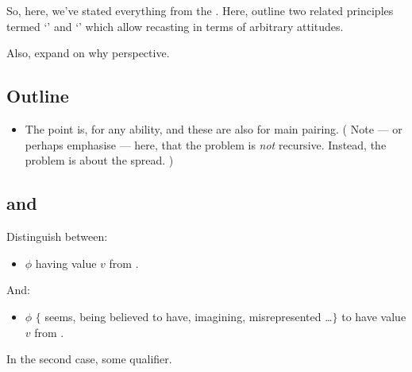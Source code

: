 \chapter{}
\label{cha:zSpA}

\nocite{Scriven:1962vq}
\nocite{Woodward:2021ue}
\nocite{Perry:1979vc}
\nocite{Perry:1986aa}

\begin{note}
  So, here, we've stated everything from the \agpe{}.
  Here, outline two related principles termed `\ptivity{}' and `\ptivityQ{}' which allow recasting in terms of arbitrary attitudes.

  Also, expand on why perspective.
\end{note}

\section{Outline}
\label{cha:zSpA:sec:outline}

\begin{note}
  \begin{itemize}
  \item
    The point is,  for any \abgen{} ability, and these are also  for main pairing.
    (%
    Note --- or perhaps emphasise --- here, that the problem is \emph{not} recursive.
    Instead, the problem is about the spread.%
    )
  \end{itemize}
\end{note}

\section{ and }
\label{cha:zSpA:sec:difficulty}

\begin{note}
  Distinguish between:
  \begin{itemize}
  \item
    \(\phi\) having value \(v\) from \agpe{}.
  \end{itemize}
  And:
    \begin{itemize}
  \item
    \(\phi\) \(\{\) seems, being believed to have, imagining, misrepresented \dots \(\}\) to have value \(v\) from \agpe{}.
  \end{itemize}

  In the second case, some qualifier.
\end{note}

